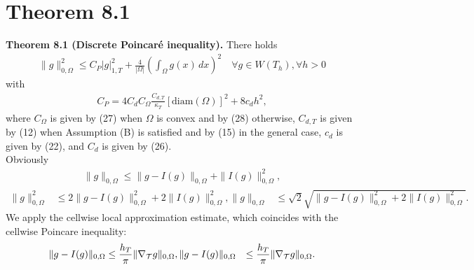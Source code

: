 \documentclass[a4paper]{article}
\begin{document}
\section*{Theorem 8.1}

\noindent \textbf{Theorem 8.1 (Discrete Poincaré inequality).} There holds
\begin{align*}
    \|g\|^2_{0,\Omega} 
    \leq 
    C_P |g|^2_{1,T} 
    + 
    \frac{4}{|\Omega|} \left( \int_{\Omega} g(x) \, dx \right)^2
        \quad 
    \forall g \in W(T_h), \forall h > 0
\end{align*}
with
\begin{align*}
C_P = 4C_d C_\Omega \frac{C_{d,T}}{\kappa_T} [\text{diam}(\Omega)]^2 + 8c_d h^2,
\end{align*}
where \(C_\Omega\) is given by (27) when \(\Omega\) is convex and by (28) otherwise, \(C_{d,T}\) is given by (12) when Assumption (B) is satisfied and by (15) in the general case, \(c_d\) is given by (22), and \(C_d\) is given by (26).
\\

\noindent Obviously
\begin{align*}
    \|g\|_{0,\Omega} 
    \leq 
    \|g - I(g)\|_{0,\Omega} + \|I(g)\|^2_{0,\Omega}
    ,
\end{align*}
\begin{align*}
    \|g\|^2_{0,\Omega} 
    &\leq 
    2\|g - I(g)\|^2_{0,\Omega} + 2\|I(g)\|^2_{0,\Omega} 
    ,
    \|g\|_{0,\Omega} 
    &\leq
    \sqrt{2}
    \sqrt{ \|g - I(g)\|^2_{0,\Omega} + 2\|I(g)\|^2_{0,\Omega} }
    .
\end{align*}
We apply the cellwise local approximation estimate, which coincides with the cellwise Poincare inequality:
\begin{align*}
    \|g - I(g)\|_{0,\Omega}
    &\leq 
    \frac{ h_T }{\pi}
    \| \nabla_{\mathcal T} g \|_{0,\Omega}
    ,
    \|g - I(g)\|_{0,\Omega}
    &\leq 
    \frac{ h_T }{\pi}
    \| \nabla_{\mathcal T} g \|_{0,\Omega}
    .
\end{align*}
\end{document}
